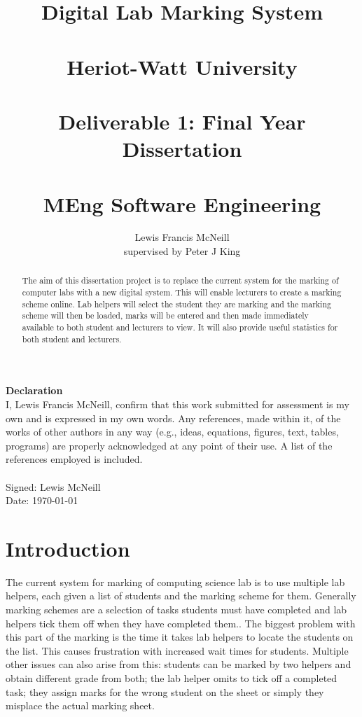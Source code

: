 \documentclass[12pt]{article}  %
\title{Digital Lab Marking System \\~\\  \large{Heriot-Watt University} \\~\\ Deliverable 1: Final Year Dissertation \\~\\ MEng Software Engineering}
\author{Lewis Francis McNeill\\
supervised by
Peter J King}
\begin{document}
\maketitle
{}
\newpage
\setcounter{page}{1}

\doublespacing
\textbf{\Large{Declaration}} \\[2em]
I, Lewis Francis McNeill, confirm that this work submitted for assessment is my own and is expressed in my own words. Any references, made within it, of the works of other authors in any way (e.g., ideas, equations, figures, text, tables, programs) are properly acknowledged at any point of their use. A list of the references employed is included.
\\
\\
Signed: Lewis McNeill
\\
Date: \today


\newpage               
\begin{abstract}
\noindent
The aim of this dissertation project is to replace the current system for the marking of computer labs with a new digital system. This will enable lecturers to create a marking scheme online. Lab helpers will select the student they are marking and the marking scheme will then be loaded, marks will be entered and then made immediately available to both student and lecturers to view. It will also provide useful statistics for both student and lecturers.
\end{abstract}
\newpage                
\tableofcontents


\newpage   
\setcounter{page}{1}
\section{Introduction}

The current system for marking of computing science lab is to use multiple lab helpers, each given a list of students and the marking scheme for them. Generally marking schemes are a selection of tasks students must have completed and lab helpers tick them off when they have completed them.. The biggest problem with this part of the marking is the time it takes lab helpers to locate the students on the list. This causes frustration with increased wait times for students.  Multiple other issues  can also  arise from this: students can be marked by two helpers and obtain different grade from both; the lab helper omits to  tick off a completed task; they assign  marks for the wrong student on the sheet or simply they misplace the actual marking sheet.
\end{document}
